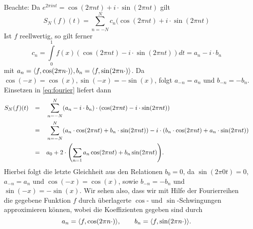 \begin{anwendung}
	Beachte: Da $e^{2\pi i n t} = \cos(2\pi n t) + i \cdot \sin(2 \pi n t)$ gilt
	\begin{equation}
		S_N(f)(t) = \sum\limits_{n = -N}^{N} c_n (\cos(2 \pi n t) + i \cdot \sin(2 \pi n t) \label{eq:fourier}
	\end{equation}
	Ist $f$ reellwertig, so gilt ferner
	\[
		c_n = \int\limits_{0}^{1} f(x) (\cos(2\pi n t) - i \cdot \sin(2 \pi n t)) dt = a_n - i \cdot b_n
	\]
	mit $a_n = \sk{f, \cos(2 \pi n \cdot)}, b_n = \sk{f,\sin(2\pi n \cdot)}$.
	Da $\cos(-x) = \cos(x), \sin(-x) = - \sin(x)$, folgt $a_{-n} = a_n$ und $b_{-n} = -b_n$.
	Einsetzen in \eqref{eq:fourier} liefert dann
	\begin{align*}
		S_N(f)(t) &\stack{}{=} \sum\limits_{n=-N}^{N} (a_n - i \cdot b_n) \cdot (\cos(2 \pi n t) - i \cdot \sin(2 \pi n t)) \\
		&\stack{}{=} \sum\limits_{n=-N}^{N} (a_n \cdot \cos(2\pi n t) + b_n \cdot \sin(2 \pi n t)) - i \cdot (b_n \cdot \cos(2\pi n t) + a_n \cdot \sin(2 \pi n t)) \\
		&\stack{}{=} a_0 + 2 \cdot \enb{\sum\limits_{n=1}^{} a_n \cos(2 \pi n t) + b_n \sin(2 \pi n t)}.
	\end{align*}
	Hierbei folgt die letzte Gleichheit aus den Relationen $b_0 = 0$, da $\sin(2 \pi 0 t) = 0$, $a_{-n} = a_n$ und $\cos(-x) = \cos(x)$, sowie $b_{-n} = -b_n$ und $\sin(-x) = -\sin(x)$. Wir sehen also, dass wir mit Hilfe der Fourierreihen die gegebene Funktion $f$ durch überlagerte $\cos$- und $\sin$-Schwingungen approximieren können, wobei die Koeffizienten gegeben sind durch
	\[
		a_n = \sk{f,\cos(2\pi n \cdot)}, \qquad b_n = \sk{f,\sin(2\pi n \cdot)}.
	\]
\end{anwendung}



\newpage